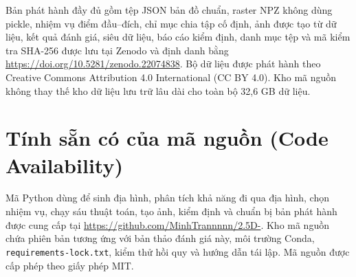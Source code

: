 \documentclass[11pt]{article}
\newcommand{\datasetrepository}{Zenodo}
\newcommand{\datasetdoi}{\url{https://doi.org/10.5281/zenodo.22074838}}
\newcommand{\datasetlicense}{Creative Commons Attribution 4.0 International (CC BY 4.0)}
\newcommand{\coderepository}{\url{https://github.com/MinhTrannnnn/2.5D-}}
\begin{document}
Bản phát hành đầy đủ gồm tệp JSON bản đồ chuẩn, raster NPZ không dùng pickle,
nhiệm vụ điểm đầu--đích, chỉ mục chia tập cố định, ảnh được tạo từ dữ liệu, kết quả đánh giá,
siêu dữ liệu, báo cáo kiểm định, danh mục tệp và mã kiểm tra SHA-256 được lưu tại
\datasetrepository{} và định danh bằng
\datasetdoi{}\cite{paired25ddata}. Bộ dữ liệu được phát hành theo
\datasetlicense{}. Kho mã nguồn không thay thế kho dữ liệu lưu trữ
lâu dài cho toàn bộ 32,6 GB dữ liệu.

\section{Tính sẵn có của mã nguồn (Code Availability)}

Mã Python dùng để sinh địa hình, phân tích khả năng đi qua địa hình, chọn nhiệm vụ,
chạy sáu thuật toán, tạo ảnh, kiểm định và chuẩn bị bản phát hành được cung
cấp tại \coderepository{}. Kho mã nguồn chứa phiên bản tương ứng với bản thảo
đánh giá này, môi trường Conda, \texttt{requirements-lock.txt}, kiểm thử hồi
quy và hướng dẫn tái lập. Mã nguồn được cấp phép theo giấy phép MIT.
\end{document}
